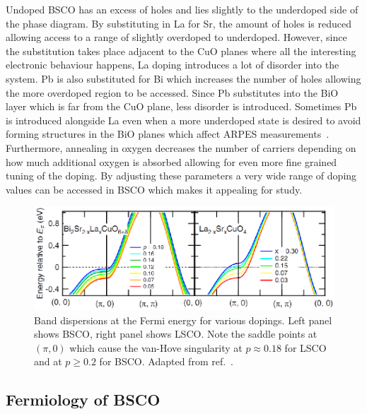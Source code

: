 Undoped \ac{BSCO} has an excess of holes and lies slightly to the underdoped side of the phase diagram. By substituting in La for Sr, the amount of holes is reduced allowing access to a range of slightly overdoped to underdoped. However, since the substitution takes place adjacent to the CuO planes where all the interesting electronic behaviour happens, La doping introduces a lot of disorder into the system. Pb is also substituted for Bi which increases the number of holes allowing the more overdoped region to be accessed. Since Pb substitutes into the BiO layer which is far from the CuO plane, less disorder is introduced. Sometimes Pb is introduced alongside La even when a more underdoped state is desired to avoid forming structures in the BiO planes which affect \ac{ARPES} measurements~\cite{Kondo2007}. Furthermore, annealing in oxygen decreases the number of carriers depending on how much additional oxygen is absorbed allowing for even more fine grained tuning of the doping. By adjusting these parameters a very wide range of doping values can be accessed in \ac{BSCO} which makes it appealing for study.

\begin{figure}[htbp]
    \begin{center}
        \includegraphics[scale=1.0]{Chapter-Introduction/Figures/VanHoveBSCOLSCO/VanHoveBSCOLSCO}
        \caption{Band dispersions at the Fermi energy for various dopings. Left panel shows \ac{BSCO}, right panel shows \ac{LSCO}. Note the saddle points at $(\pi, 0)$ which cause the van-Hove singularity at $p\approx 0.18$ for \ac{LSCO} and at $p \geq 0.2$ for \ac{BSCO}. Adapted from ref.~\cite{Hashimoto2008}.}
        \label{Fig:Intro:VanHoveBSCOLSCO}
    \end{center}
\end{figure}

\subsection{Fermiology of \ac{BSCO}}

